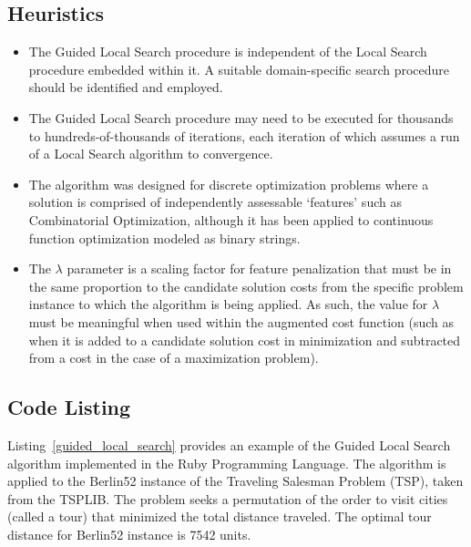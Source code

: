 \subsection{Heuristics}
\begin{itemize}
	\item The Guided Local Search procedure is independent of the Local Search procedure embedded within it. A suitable domain-specific search procedure should be identified and employed.
	\item The Guided Local Search procedure may need to be executed for thousands to hundreds-of-thousands of iterations, each iteration of which assumes a run of a Local Search algorithm to convergence.
	\item The algorithm was designed for discrete optimization problems where a solution is comprised of independently assessable `features' such as Combinatorial Optimization, although it has been applied to continuous function optimization modeled as binary strings.
	\item The $\lambda$ parameter is a scaling factor for feature penalization that must be in the same proportion to the candidate solution costs from the specific problem instance to which the algorithm is being applied. As such, the value for $\lambda$ must be meaningful when used within the augmented cost function (such as when it is added to a candidate solution cost in minimization and subtracted from a cost in the case of a maximization problem).
\end{itemize}

\subsection{Code Listing}
Listing~\ref{guided_local_search} provides an example of the Guided Local Search algorithm implemented in the Ruby Programming Language. 
The algorithm is applied to the Berlin52 instance of the Traveling Salesman Problem (TSP), taken from the TSPLIB. The problem seeks a permutation of the order to visit cities (called a tour) that minimized the total distance traveled. The optimal tour distance for Berlin52 instance is 7542 units.

